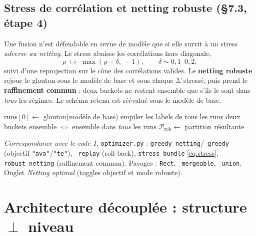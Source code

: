 \documentclass[11pt,a4paper]{article}
\newcommand{\code}[1]{\texttt{#1}}
\theoremstyle{plain}
\theoremstyle{definition}
\theoremstyle{remark}
\newtheorem*{impl}{Correspondance avec le code}
\begin{document}
\subsection{Stress de corrélation et netting robuste (\S7.3, étape 4)}
Une fusion n'est défendable en revue de modèle que si elle survit à un stress
\emph{adverse au netting}. Le stress abaisse les corrélations hors diagonale,
\begin{equation}
\rho \;\longmapsto\; \max(\rho - \delta,\,-1),\qquad \delta \sim 0{,}1\text{--}0{,}2,
\label{eq:stress}
\end{equation}
suivi d'une reprojection sur le cône des corrélations valides. Le \textbf{netting
robuste} rejoue le glouton sous le modèle de base et sous chaque $\Sigma$ stressé, puis
prend le \textbf{raffinement commun} : deux buckets ne restent ensemble que s'ils le
sont dans \emph{tous} les régimes. Le schéma retenu est réévalué sous le modèle de base.

\begin{algorithm}[H]
\caption{Netting robuste --- raffinement commun sous stress de corrélation}
$\text{runs}[0] \leftarrow$ glouton(modèle de base)\;
empiler les labels de tous les runs\;
deux buckets ensemble $\iff$ ensemble dans \emph{tous} les runs
$\mathcal P_{\text{rob}} \leftarrow$ partition résultante\;
\;
\end{algorithm}

\begin{impl}
\code{optimizer.py} : \code{greedy\_netting}/\code{\_greedy} (objectif
\code{"ava"}/\code{"te"}), \code{\_replay} (roll-back), \code{stress\_bundle}
\eqref{eq:stress}, \code{robust\_netting} (raffinement commun). Pavages :
\code{Rect}, \code{\_mergeable}, \code{\_union}. Onglet \emph{Netting optimal}
(toggles objectif et mode robuste).
\end{impl}

\section{Architecture découplée : structure $\perp$ niveau}\label{sec:decouple}
\end{document}
